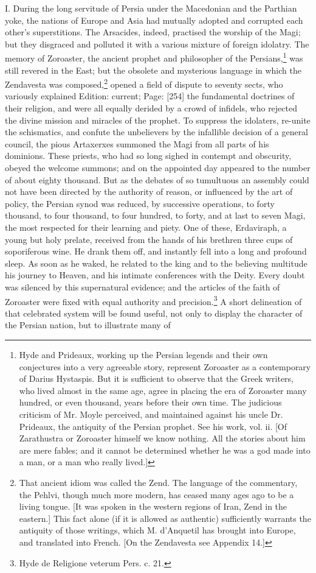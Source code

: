 I. During the long servitude of Persia under the Macedonian and the Parthian yoke, the nations of Europe and Asia had mutually adopted and corrupted each other\texthebrew{}’s superstitions. The Arsacides, indeed, practised the worship of the Magi; but they disgraced and polluted it with a various mixture of foreign idolatry. The memory of Zoroaster, the ancient prophet and philosopher of the Persians,\footnote{Hyde and Prideaux, working up the Persian legends and their own conjectures into a very agreeable story, represent Zoroaster as a contemporary of Darius Hystaspis. But it is sufficient to observe that the Greek writers, who lived almost in the same age, agree in placing the era of Zoroaster many hundred, or even thousand, years before their own time. The judicious criticism of Mr. Moyle perceived, and maintained against his uncle Dr. Prideaux, the antiquity of the Persian prophet. See his work, vol. ii. [Of Zarathustra or Zoroaster himself we know nothing. All the stories about him are mere fables; and it cannot be determined whether he was a god made into a man, or a man who really lived.]} was still revered in the East; but the obsolete and mysterious language in which the Zendavesta was composed,\footnote{That ancient idiom was called the Zend. The language of the commentary, the Pehlvi, though much more modern, has ceased many ages ago to be a living tongue. [It was spoken in the western regions of Iran, Zend in the eastern.] This fact alone (if it is allowed as authentic) sufficiently warrants the antiquity of those writings, which M. d\texthebrew{}’Anquetil has brought into Europe, and translated into French. [On the Zendavesta see Appendix 14.]} opened a field of dispute to seventy sects, who variously explained Edition: current; Page: [254] the fundamental doctrines of their religion, and were all equally derided by a crowd of infidels, who rejected the divine mission and miracles of the prophet. To suppress the idolaters, re-unite the schismatics, and confute the unbelievers by the infallible decision of a general council, the pious Artaxerxes summoned the Magi from all parts of his dominions. These priests, who had so long sighed in contempt and obscurity, obeyed the welcome summons; and on the appointed day appeared to the number of about eighty thousand. But as the debates of so tumultuous an assembly could not have been directed by the authority of reason, or influenced by the art of policy, the Persian synod was reduced, by successive operations, to forty thousand, to four thousand, to four hundred, to forty, and at last to seven Magi, the most respected for their learning and piety. One of these, Erdaviraph, a young but holy prelate, received from the hands of his brethren three cups of soporiferous wine. He drank them off, and instantly fell into a long and profound sleep. As soon as he waked, he related to the king and to the believing multitude his journey to Heaven, and his intimate conferences with the Deity. Every doubt was silenced by this supernatural evidence; and the articles of the faith of Zoroaster were fixed with equal authority and precision.\footnote{Hyde de Religione veterum Pers. c. 21.} A short delineation of that celebrated system will be found useful, not only to display the character of the Persian nation, but to illustrate many of 